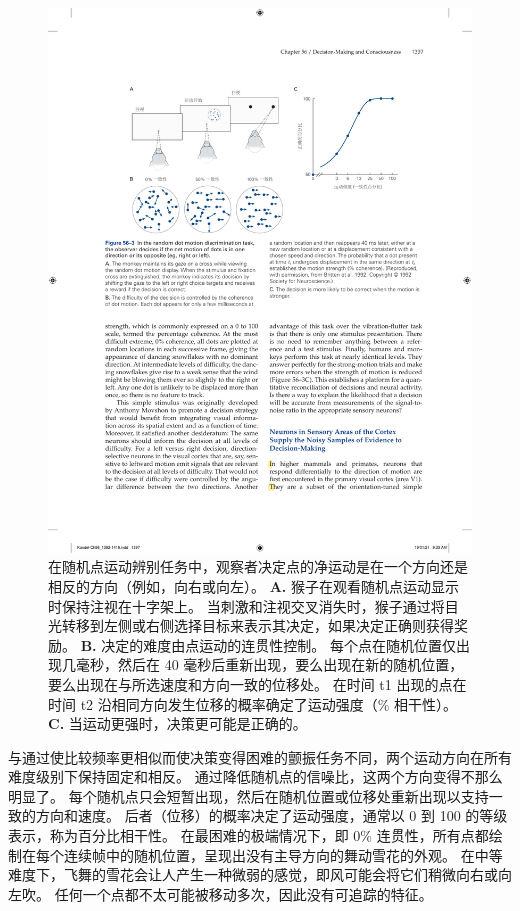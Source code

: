 \begin{figure}[htbp]
	\centering
	\includegraphics[width=0.9\linewidth]{chap56/fig_56_3}
	\caption{在随机点运动辨别任务中，观察者决定点的净运动是在一个方向还是相反的方向（例如，向右或向左）。
		\textbf{A.} 猴子在观看随机点运动显示时保持注视在十字架上。
		当刺激和注视交叉消失时，猴子通过将目光转移到左侧或右侧选择目标来表示其决定，如果决定正确则获得奖励。
		\textbf{B.} 决定的难度由点运动的连贯性控制。
		每个点在随机位置仅出现几毫秒，然后在 40 毫秒后重新出现，要么出现在新的随机位置，要么出现在与所选速度和方向一致的位移处。
		在时间 t1 出现的点在时间 t2 沿相同方向发生位移的概率确定了运动强度（\% 相干性）\cite{britten1992analysis}。
		\textbf{C.} 当运动更强时，决策更可能是正确的。}
	\label{fig:56_3}
\end{figure}


与通过使比较频率更相似而使决策变得困难的颤振任务不同，两个运动方向在所有难度级别下保持固定和相反。
通过降低随机点的信噪比，这两个方向变得不那么明显了。
每个随机点只会短暂出现，然后在随机位置或位移处重新出现以支持一致的方向和速度。
后者（位移）的概率决定了运动强度，通常以 0 到 100 的等级表示，称为百分比相干性。
在最困难的极端情况下，即 0\% 连贯性，所有点都绘制在每个连续帧中的随机位置，呈现出没有主导方向的舞动雪花的外观。
在中等难度下，飞舞的雪花会让人产生一种微弱的感觉，即风可能会将它们稍微向右或向左吹。
任何一个点都不太可能被移动多次，因此没有可追踪的特征。


